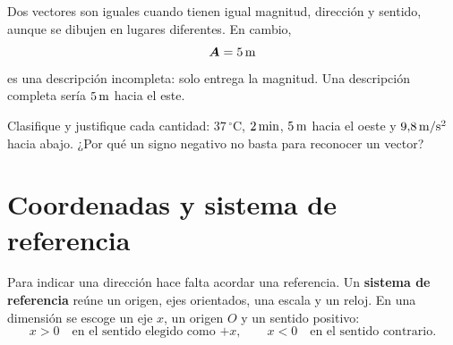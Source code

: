 \documentclass[11pt]{article}
\begin{document}
\begin{center}
\end{center}

Dos vectores son iguales cuando tienen igual magnitud, dirección y sentido,
aunque se dibujen en lugares diferentes. En cambio,
\[
  \boldsymbol{A}=5\,\mathrm{m}
\]
es una descripción incompleta: solo entrega la magnitud. Una descripción
completa sería \(5\,\mathrm{m}\) hacia el este.

\begin{pregunta}
Clasifique y justifique cada cantidad:
\(37\,^\circ\mathrm{C}\), \(2\,\mathrm{min}\),
\(5\,\mathrm{m}\) hacia el oeste y
\(9{,}8\,\mathrm{m/s^2}\) hacia abajo. ¿Por qué un signo negativo no basta
para reconocer un vector?
\end{pregunta}

\section{Coordenadas y sistema de referencia}

Para indicar una dirección hace falta acordar una referencia. Un
\textbf{sistema de referencia} reúne un origen, ejes orientados, una escala y
un reloj. En una dimensión se escoge un eje \(x\), un origen \(O\) y un
sentido positivo:
\[
  x>0\quad\text{en el sentido elegido como \(+x\)},\qquad
  x<0\quad\text{en el sentido contrario}.
\]

\begin{center}
\end{center}
\end{document}
